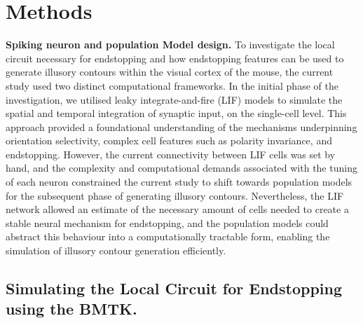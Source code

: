 \documentclass[12pt]{article}
\begin{document}
\section{Methods}
\noindent \textbf{Spiking neuron and population Model design.} \newline
To investigate the local circuit necessary for endstopping and how endstopping features can be used to generate illusory contours within the visual cortex of the mouse, the current study used two distinct computational frameworks. In the initial phase of the investigation, we utilised leaky integrate-and-fire (LIF) models to simulate the spatial and temporal integration of synaptic input, on the single-cell level. This approach provided a foundational understanding of the mechanisms underpinning orientation selectivity, complex cell features such as polarity invariance, and endstopping. However, the current connectivity between LIF cells was set by hand, and the complexity and computational demands associated with the tuning of each neuron constrained the current study to shift towards population models for the subsequent phase of generating illusory contours. Nevertheless, the LIF network allowed an estimate of the necessary amount of cells needed to create a stable neural mechanism for endstopping, and the population models could abstract this behaviour into a computationally tractable form, enabling the simulation of illusory contour generation efficiently. 

\bigbreak
\subsection{Simulating the Local Circuit for Endstopping using the BMTK.}
\end{document}
